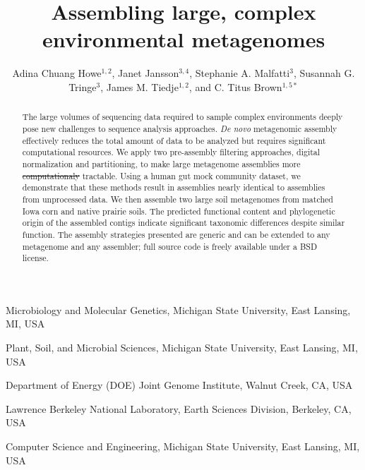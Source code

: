 \documentclass{nature}%
\title{Assembling large, complex environmental metagenomes}
\author{Adina Chuang Howe$^{1,2}$, Janet Jansson$^{3,4}$, Stephanie A. %
Malfatti$^{3}$, Susannah G. Tringe$^{3}$, James M. Tiedje$^{1,2}$, and C. Titus %
Brown$^{1,5\ast}$}  %
\providecommand{\DIFadd}[1]{{\protect\color{blue}\uwave{#1}}} %
\providecommand{\DIFdel}[1]{{\protect\color{red}\sout{#1}}}                      %
\providecommand{\DIFaddbegin}{} %
\providecommand{\DIFaddend}{} %
\providecommand{\DIFdelbegin}{} %
\providecommand{\DIFdelend}{} %
\begin{document}
 \maketitle

\begin{affiliations} \item Microbiology and Molecular Genetics, Michigan State
University, East Lansing, MI, USA\\ \item Plant, Soil, and Microbial Sciences,
Michigan State University, East Lansing, MI, USA\\ \item Department of Energy
(DOE) Joint Genome Institute, Walnut Creek, CA, USA\\ \item Lawrence Berkeley
National Laboratory, Earth Sciences Division, Berkeley, CA, USA\\ \item Computer Science and Engineering, Michigan State University, East Lansing, MI, USA\\
\end{affiliations}

\begin{abstract} The large volumes of sequencing data required to sample
complex environments deeply pose new challenges to sequence analysis approaches.
\emph{De novo} metagenomic assembly effectively reduces the total amount of
data to be analyzed but requires significant computational resources. We apply
two pre-assembly filtering approaches, digital normalization and partitioning, to
make large metagenome assemblies more \DIFdelbegin \DIFdel{computationaly }\DIFdelend \DIFaddbegin \DIFadd{computationally }\DIFaddend tractable. Using a human
gut mock community dataset, we demonstrate that these methods result in
assemblies nearly identical to assemblies from unprocessed data. We then
assemble two large soil metagenomes from matched Iowa corn and native prairie
soils. The predicted functional content and phylogenetic origin of the
assembled contigs indicate significant taxonomic differences despite similar
function. The assembly strategies presented are generic and can be extended to
any metagenome and any assembler; full source code is freely available under a
BSD license. \end{abstract}
\end{document}
